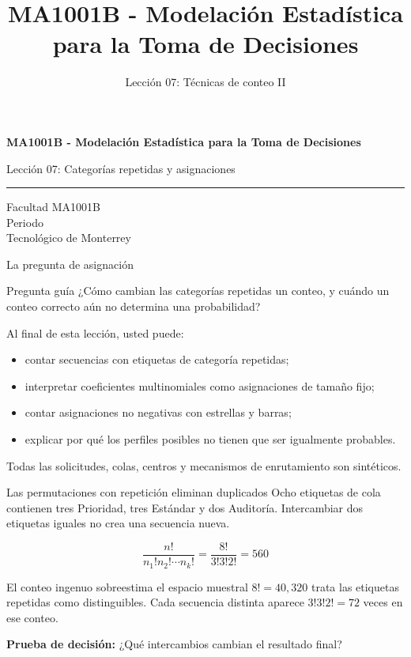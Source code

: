 \documentclass[aspectratio=169,10pt,spanish]{beamer}
\title{MA1001B - Modelación Estadística para la Toma de Decisiones}
\subtitle{Lección 07: Técnicas de conteo II}
\author{}
\institute{Tecnol\'ogico de Monterrey}
\date{}
\begin{document}
\begin{frame}[plain]
  \vspace{1.2cm}
  {\Large\bfseries MA1001B - Modelación Estadística para la Toma de Decisiones\par}
  \vspace{0.7cm}
  {\large Lección 07: Categorías repetidas y asignaciones\par}
  \vspace{0.7cm}
  {\color{TecRojo}\rule{\textwidth}{1.2pt}}
  \vspace{0.8cm}

  Facultad MA1001B\\[0.3cm]
  Periodo\\[0.3cm]
  Tecnol\'ogico de Monterrey
\end{frame}

\begin{frame}{La pregunta de asignación}
  \begin{alertblock}{Pregunta guía}
    ¿Cómo cambian las categorías repetidas un conteo, y cuándo un conteo
    correcto aún no determina una probabilidad?
  \end{alertblock}

  \vspace{0.4em}
  Al final de esta lección, usted puede:
  \begin{itemize}
    \item contar secuencias con etiquetas de categoría repetidas;
    \item interpretar coeficientes multinomiales como asignaciones de tamaño fijo;
    \item contar asignaciones no negativas con estrellas y barras;
    \item explicar por qué los perfiles posibles no tienen que ser igualmente
      probables.
  \end{itemize}

  \vfill
  \scriptsize Todas las solicitudes, colas, centros y mecanismos de enrutamiento son sintéticos.
\end{frame}

\begin{frame}{Las permutaciones con repetición eliminan duplicados}
  \small
  Ocho etiquetas de cola contienen tres Prioridad, tres Estándar y dos
  Auditoría. Intercambiar dos etiquetas iguales no crea una secuencia nueva.

  \[
    \frac{n!}{n_1!n_2!\cdots n_k!}
    =\frac{8!}{3!3!2!}=560
  \]

  \begin{alertblock}{El conteo ingenuo sobreestima el espacio muestral}
    \(8!=40{,}320\) trata las etiquetas repetidas como distinguibles. Cada
    secuencia distinta aparece \(3!3!2!=72\) veces en ese conteo.
  \end{alertblock}

  \textbf{Prueba de decisión:} ¿Qué intercambios cambian el resultado final?
\end{frame}
\end{document}
